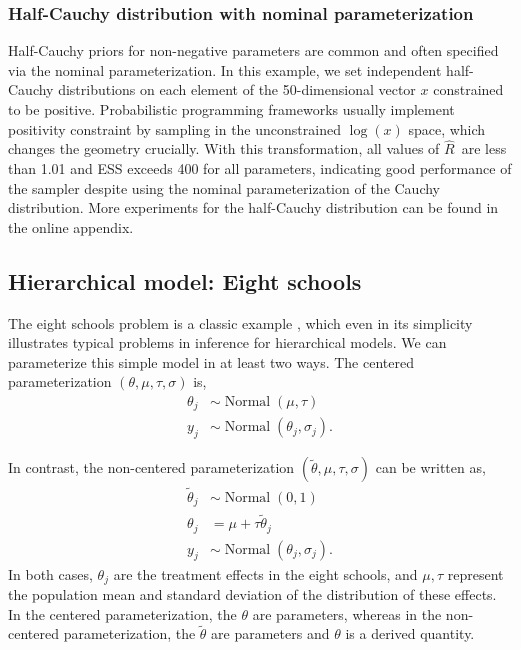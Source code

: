 \documentclass[american,]{article}
\DeclareMathOperator{\N}{Normal}
\newcommand{\Rhat}{$\widehat{R}$}
\theoremstyle{definition}
\begin{document}
\hypertarget{half-cauchy-distribution-with-nominal-parameterization}{%
\subsubsection*{Half-Cauchy distribution with nominal
parameterization}\label{half-cauchy-distribution-with-nominal-parameterization}}

Half-Cauchy priors for non-negative parameters are common and 
often specified via the nominal parameterization.
In this example, we set independent half-Cauchy distributions on each element
of the 50-dimensional vector $x$ constrained to be positive. Probabilistic programming
frameworks usually implement positivity constraint by 
sampling in the unconstrained \(\log(x)\) space, which
changes the geometry crucially. With this transformation, all values of \Rhat\ are less than 1.01 and ESS exceeds 400 for all parameters, indicating good performance of the sampler despite using the nominal parameterization of
the Cauchy distribution. More experiments for the half-Cauchy distribution 
can be found in the online appendix.




\hypertarget{eightschools}{%
\subsection{Hierarchical model: Eight schools}\label{eightschools}}

The eight schools problem is a classic example
\citep[see Section 5.5 in][]{BDA3}, which even in its
simplicity illustrates typical problems in inference for
hierarchical models. We can parameterize this simple model
in at least two ways. The centered parameterization $(\theta, \mu,
\tau, \sigma)$ is,
\begin{align*}
\theta_j &\sim \N(\mu, \tau) \\
y_j &\sim \N(\theta_j, \sigma_j).
\end{align*}

In contrast, the non-centered parameterization
$(\tilde{\theta}, \mu, \tau, \sigma)$ can be written as,
\begin{align*}
\tilde{\theta}_j &\sim \N(0, 1) \\
\theta_j &= \mu + \tau \tilde{\theta}_j \\
y_j &\sim \N(\theta_j, \sigma_j).
\end{align*}
In both cases, $\theta_j$ are the treatment effects in the eight schools,
and $\mu, \tau$ represent the population mean and standard deviation 
of the distribution of these effects. In the centered
parameterization, the $\theta$ are parameters, whereas in the
non-centered parameterization, the $\tilde{\theta}$ are parameters and
$\theta$ is a derived quantity.
\end{document}
